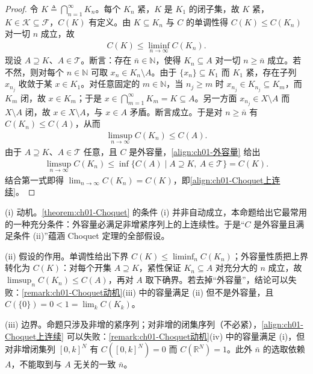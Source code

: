\documentclass[../../main.tex]{subfiles}%
\begin{document}
\begin{proof}
令 $K\triangleq\bigcap_{n=1}^\infty K_n$。每个 $K_n$ 紧，$K$ 是 $K_1$ 的闭子集，故 $K$ 紧，$K\in\mathcal{K}\subseteq\mathcal{F}$，$C(K)$ 有定义。由 $K\subseteq K_n$ 与 $C$ 的单调性得 $C(K)\leqslant C(K_n)$ 对一切 $n$ 成立，故
\begin{align*}
C(K)\leqslant\liminf_{n\to\infty}C(K_n).
\end{align*}
现设 $A\supseteq K$、$A\in\mathcal{T}$。断言：存在 $\bar{n}\in\mathbb{N}$，使得 $K_n\subseteq A$ 对一切 $n\geqslant\bar n$ 成立。若不然，则对每个 $n\in\mathbb{N}$ 可取 $x_n\in K_n\setminus A$。由于 $\{x_n\}\subseteq K_1$ 而 $K_1$ 紧，存在子列 $x_{n_j}$ 收敛于某 $x\in K_1$。对任意固定的 $m\in\mathbb{N}$，当 $n_j\geqslant m$ 时 $x_{n_j}\in K_{n_j}\subseteq K_m$，而 $K_m$ 闭，故 $x\in K_m$；于是 $x\in\bigcap_{m=1}^\infty K_m=K\subseteq A$。另一方面 $x_{n_j}\in X\setminus A$ 而 $X\setminus A$ 闭，故 $x\in X\setminus A$，与 $x\in A$ 矛盾。断言成立。于是对 $n\geqslant\bar n$ 有 $C(K_n)\leqslant C(A)$，从而
\begin{align*}
\limsup_{n\to\infty}C(K_n)\leqslant C(A).
\end{align*}
由于 $A\supseteq K$、$A\in\mathcal{T}$ 任意，且 $C$ 是外容量，\eqref{align:ch01-外容量} 给出
\begin{align*}
\limsup_{n\to\infty}C(K_n)\leqslant\inf\{C(A)\mid A\supseteq K,\ A\in\mathcal{T}\}=C(K).
\end{align*}
结合第一式即得 $\lim_{n\to\infty}C(K_n)=C(K)$，即\eqref{align:ch01-Choquet上连续}。
\end{proof}

\begin{remark}\label{remark:ch01-外容量上连续动机}
(i) 动机。\cref{theorem:ch01-Choquet} 的条件 (i) 并非自动成立，本命题给出它最常用的一种充分条件：外容量必满足非增紧序列上的上连续性。于是“$C$ 是外容量且满足条件 (ii)”蕴涵 Choquet 定理的全部假设。

(ii) 假设的作用。单调性给出下界 $C(K)\leqslant\liminf_nC(K_n)$；外容量性质把上界转化为 $C(K)$：对每个开集 $A\supseteq K$，紧性保证 $K_n\subseteq A$ 对充分大的 $n$ 成立，故 $\limsup_nC(K_n)\leqslant C(A)$，再对 $A$ 取下确界。若去掉“外容量”，结论可以失败：\cref{remark:ch01-Choquet动机}(iii) 中的容量满足 (ii) 但不是外容量，且 $C(\{0\})=0<1=\lim_kC(K_k)$。

(iii) 边界。命题只涉及非增的紧序列；对非增的闭集序列（不必紧），\eqref{align:ch01-Choquet上连续} 可以失败：\cref{remark:ch01-Choquet动机}(iv) 中的容量满足 (i)，但对非增闭集列 $[0,k]^N$ 有 $C([0,k]^N)=0$ 而 $C(\mathbb{R}^N)=1$。此外 $\bar n$ 的选取依赖 $A$，不能取到与 $A$ 无关的一致 $\bar n$。
\end{remark}
\end{document}
